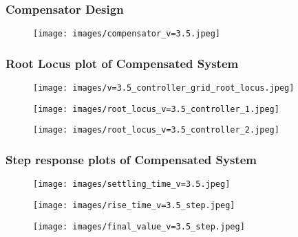 \documentclass[notitlepage]{article}
\begin{document}
\subsubsection{Compensator Design}
\begin{figure}[h!]
    \centering
    \texttt{[image: images/compensator\_v=3.5.jpeg]}
     \label{fig:my_label}
 \end{figure}
 \pagebreak
\subsubsection{Root Locus plot of Compensated System}
\begin{figure}[h!]
    \centering
    \texttt{[image: images/v=3.5\_controller\_grid\_root\_locus.jpeg]}
     \label{fig:my_label}
 \end{figure}
\begin{figure}[h!]
    \centering
    \texttt{[image: images/root\_locus\_v=3.5\_controller\_1.jpeg]}
     \label{fig:my_label}
 \end{figure}

\begin{figure}[h!]
    \centering
    \texttt{[image: images/root\_locus\_v=3.5\_controller\_2.jpeg]}
     \label{fig:my_label}
 \end{figure}

 \pagebreak
 \subsubsection{Step response plots of Compensated System}
 \begin{figure}[h!]
    \centering
    \texttt{[image: images/settling\_time\_v=3.5.jpeg]}
     \label{fig:my_label}
 \end{figure}

 \begin{figure}[h!]
    \centering
    \texttt{[image: images/rise\_time\_v=3.5\_step.jpeg]}
     \label{fig:my_label}
 \end{figure}

 \begin{figure}[h!]
    \centering
    \texttt{[image: images/final\_value\_v=3.5\_step.jpeg]}
     \label{fig:my_label}
 \end{figure}
\end{document}
